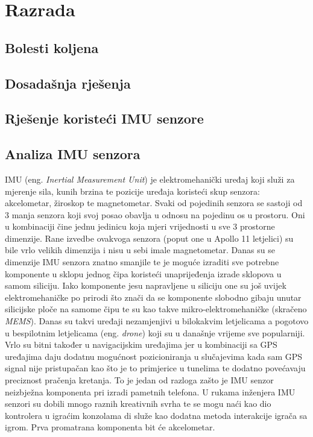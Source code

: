 \documentclass[times, utf8, diplomski]{fer}
\begin{document}
\chapter{Razrada}

\section{Bolesti koljena}

\section{Dosadašnja rješenja}

\section{Rješenje koristeći IMU senzore}

\section{Analiza IMU senzora}
IMU (eng. \textit{Inertial Measurement Unit}) je elektromehanički uređaj koji služi za mjerenje sila, kunih brzina te pozicije
uređaja koristeći skup senzora: akcelometar, žiroskop te magnetometar. Svaki od pojedinih senzora se sastoji od 3 manja senzora
koji svoj posao obavlja u odnosu na pojedinu os u prostoru. Oni u kombinaciji čine jednu jedinicu koja mjeri vrijednosti u sve 
3 prostorne dimenzije. Rane izvedbe ovakvoga senzora (poput one u Apollo 11 letjelici) su bile vrlo velikih dimenzija i nisu
u sebi imale magnetometar. Danas su se dimenzije IMU senzora znatno smanjile te je moguće izraditi sve potrebne komponente u
sklopu jednog čipa koristeći unaprijeđenja izrade sklopova u samom siliciju. Iako komponente jesu napravljene u siliciju one su
još uvijek elektromehaničke po prirodi što znači da se komponente slobodno gibaju unutar silicijske ploče na samome čipu
te su kao takve mikro-elektromehaničke (skračeno \textit{MEMS}). Danas su takvi uređaji nezamjenjivi u bilokakvim letjelicama a
pogotovo u bespilotnim letjelicama (eng. \textit{drone}) koji su u današnje vrijeme sve popularniji. Vrlo su bitni također u
navigacijskim uređajima jer u kombinaciji sa GPS uređajima daju dodatnu mogućnost pozicioniranja u slučajevima kada sam GPS signal
nije pristupačan kao što je to primjerice u tunelima te dodatno povećavaju preciznost pračenja kretanja. To je jedan od razloga
zašto je IMU senzor neizbježna komponenta pri izradi pametnih telefona. U rukama inženjera IMU senzori su dobili mnogo raznih 
kreativnih svrha te se mogu naći kao dio kontrolera u igraćim konzolama di služe kao dodatna metoda interakcije igrača sa igrom.
Prva promatrana komponenta bit će akcelometar.
\end{document}
